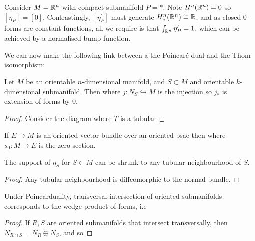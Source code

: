 \documentclass{article}
\begin{document}
\begin{example}
	Consider $M= \mathbb{R}^n$ with compact submanifold $P=\ast$. Note $H^n(\mathbb{R}^n)=0$ so $[\eta_P]=[0]$. Contrastingly, $[\eta_P^\prime]$ must generate $H^n_c(\mathbb{R}^n)\cong \mathbb{R}$, and as closed $0$-forms are constant functions, all we require is that $\int_{\mathbb{R}^n} \eta_P^\prime=1$, which can be achieved by a normalised bump function. 
\end{example}

We can now make the following link between a the Poincar\'e dual and the Thom isomorphism:

\begin{prop}
Let $M$ be an orientable $n$-dimensional manifold, and $S \subset M$ and orientable $k$-dimensional submanifold. Then 
where $j:N_S \hookrightarrow M$ is the injection so $j_\ast$ is extension of forms by 0. 
\end{prop}
\begin{proof}
	Consider the diagram 
where $T$ is a tubular 
\end{proof}

\begin{corollary}
	If $E\to M$ is an oriented vector bundle over an oriented bsae then 
where $s_0:M\to E$ is the zero section. 
\end{corollary}

\begin{corollary}
	The support of $\eta_S$ for $S\subset M$ can be shrunk to any tubular neighbourhood of $S$.
\end{corollary}
\begin{proof}
	Any tubular neighbourhood is diffeomorphic to the normal bundle. 
\end{proof}

\begin{prop}
	Under Poincar\' duality, transversal intersection of oriented submanifolds corresponds to the wedge product of forms, i.e 
\end{prop}
\begin{proof}
	If $R,S$ are oriented submanifolds that intersect transversally, then $N_{R\cap S} = N_R \oplus N_S$, and so 
\end{proof}
\end{document}
